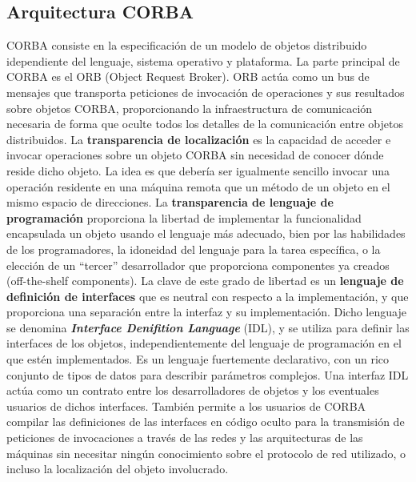 \documentclass[
	12pt, %
	fleqn, %
	a4paper, %
	oneside, %
]{LegrandOrangeBook}
\begin{document}
\subsection{Arquitectura CORBA}
CORBA consiste en la especificación de un modelo de objetos distribuido idependiente del lenguaje, sistema operativo y plataforma. La parte principal de CORBA es el ORB (Object Request Broker). ORB actúa como un bus de mensajes que transporta peticiones de invocación de operaciones y sus resultados sobre objetos CORBA, proporcionando la infraestructura de comunicación necesaria de forma que oculte todos los detalles de la comunicación entre objetos distribuidos. La \textbf{transparencia de localización} es la capacidad de acceder e invocar operaciones sobre un objeto CORBA sin necesidad de conocer dónde reside dicho objeto. La idea es que debería ser igualmente sencillo invocar una operación residente en una máquina remota que un método de un objeto en el mismo espacio de direcciones. La \textbf{transparencia de lenguaje de programación} proporciona la libertad de implementar la funcionalidad encapsulada un objeto usando el lenguaje más adecuado, bien por las habilidades de los programadores, la idoneidad del lenguaje para la tarea específica, o la elección de un ``tercer'' desarrollador que proporciona componentes ya creados (off-the-shelf components). La clave de este grado de libertad es un \textbf{lenguaje de definición de interfaces} que es neutral con respecto a la implementación, y que proporciona una separación entre la interfaz y su implementación. Dicho lenguaje se denomina \textbf{\textit{Interface Denifition Language}} (IDL), y se utiliza para definir las interfaces de los objetos, independientemente del lenguaje de programación en el que estén implementados. Es un lenguaje fuertemente declarativo, con un rico conjunto de tipos de datos para describir parámetros complejos. Una interfaz IDL actúa como un contrato entre los desarrolladores de objetos y los eventuales usuarios de dichos interfaces. También permite a los usuarios de CORBA compilar las definiciones de las interfaces en código oculto para la transmisión de peticiones de invocaciones a través de las redes y las arquitecturas de las máquinas sin necesitar ningún conocimiento sobre el protocolo de red utilizado, o incluso la localización del objeto involucrado.
\end{document}
